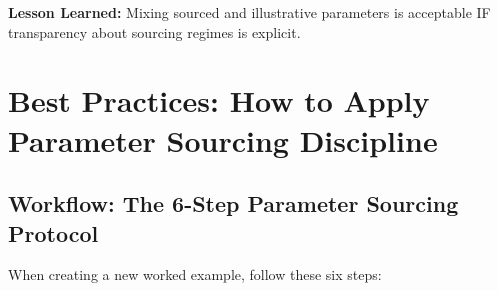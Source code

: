 \textbf{Lesson Learned:} Mixing sourced and illustrative parameters is acceptable IF transparency about sourcing regimes is explicit.


\section{Best Practices: How to Apply Parameter Sourcing Discipline}
\label{sec:jjj-practices}

\subsection{Workflow: The 6-Step Parameter Sourcing Protocol}
\label{subsec:jjj-protocol}

When creating a new worked example, follow these six steps:

